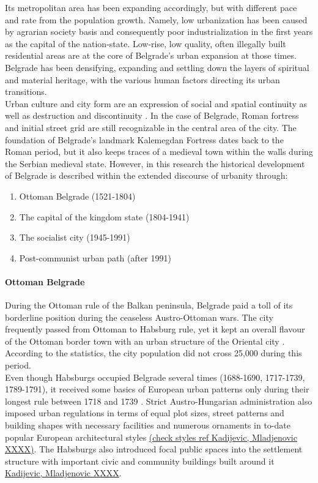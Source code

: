 \documentclass[11pt]{report}
\begin{document}
Its metropolitan area has been expanding accordingly, but with different pace and rate from the population growth. Namely, low urbanization has been caused by agrarian society basis and consequently poor industrialization in the first years as the capital of the nation-state.
Low-rise, low quality, often illegally built residential areas are at the core of Belgrade's urban expansion at those times. Belgrade has been densifying, expanding and settling down the layers of spiritual and material heritage, with the various human factors directing its urban transitions.
\\

Urban culture and city form are an expression of social and spatial continuity as well as destruction and discontinuity \href{}{\citealt{grozdanic_belgrade_2008}}. In the case of Belgrade, Roman fortress and initial street grid are still recognizable in the central area of the city.
The foundation of Belgrade's landmark Kalemegdan Fortress dates back to the Roman period, but it also keeps traces of a medieval town within the walls during the Serbian medieval state.
However, in this research the historical development of Belgrade is described within the extended discourse of urbanity through:

\begin{enumerate}
\item Ottoman Belgrade (1521-1804)
\item The capital of the kingdom state (1804-1941)
\item The socialist city (1945-1991)
\item Post-communist urban path (after 1991)
\end{enumerate}

\paragraph{Ottoman Belgrade}

During the Ottoman rule of the Balkan peninsula, Belgrade paid a toll of its borderline position during the ceaseless Austro-Ottoman wars.
The city frequently passed from Ottoman to Habsburg rule, yet it kept an overall flavour of the Ottoman border town with an urban structure of the Oriental city \href{}{\citealt{hirt_belgrade_2009}}.
According to the statistics, the city population did not cross 25,000 during this period.
\\

Even though Habsburgs occupied Belgrade several times
(1688-1690, 1717-1739, 1789-1791), it received some basics of European urban patterns only during their longest rule between 1718 and 1739 \href{}{\citealt{doytchinov_belgrade_2015}}.
Strict Austro-Hungarian administration also imposed urban regulations in terms of equal plot sizes, street patterns and building shapes with necessary facilities and numerous ornaments in to-date popular European architectural styles \href{}{(check styles ref Kadijevic, Mladjenovic XXXX)}.
The Habsburgs also introduced focal public spaces into the settlement structure with important civic and community buildings built around it \href{}{Kadijevic, Mladjenovic XXXX}.
\\
\end{document}
